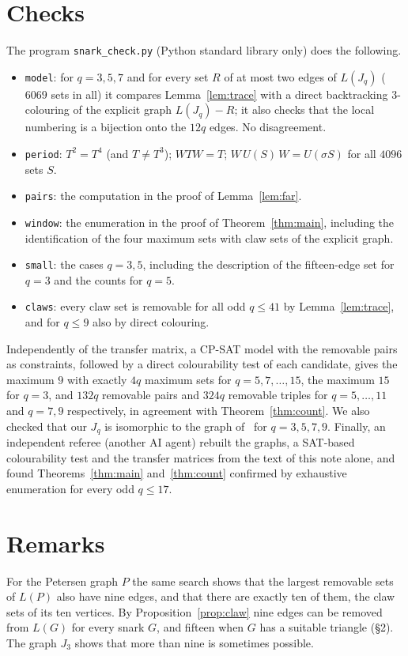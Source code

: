 \documentclass[11pt]{amsart}
\theoremstyle{remark}
\begin{document}
\section{Checks}\label{sec:check}
The program \texttt{snark\_check.py} (Python standard library only) does the following.
\begin{itemize}
\item \texttt{model}: for $q=3,5,7$ and for every set $R$ of at most two edges of $L(J_q)$ ($6069$ sets in all) it
compares Lemma~\ref{lem:trace} with a direct backtracking $3$-colouring of the explicit graph $L(J_q)-R$; it also
checks that the local numbering is a bijection onto the $12q$ edges. No disagreement.
\item \texttt{period}: $T^2=T^4$ (and $T\ne T^3$); $WTW=T$; $W\,U(S)\,W=U(\sigma S)$ for all $4096$ sets $S$.
\item \texttt{pairs}: the computation in the proof of Lemma~\ref{lem:far}.
\item \texttt{window}: the enumeration in the proof of Theorem~\ref{thm:main}, including the identification of the
four maximum sets with claw sets of the explicit graph.
\item \texttt{small}: the cases $q=3,5$, including the description of the fifteen-edge set for $q=3$ and the
counts for $q=5$.
\item \texttt{claws}: every claw set is removable for all odd $q\le41$ by Lemma~\ref{lem:trace}, and for $q\le9$ also
by direct colouring.
\end{itemize}
Independently of the transfer matrix, a CP-SAT model with the removable pairs as constraints, followed by a direct
colourability test of each candidate, gives the maximum $9$ with exactly $4q$ maximum sets for $q=5,7,\dots,15$,
the maximum $15$ for $q=3$, and $132q$ removable pairs and $324q$ removable triples for $q=5,\dots,11$ and $q=7,9$
respectively, in agreement with Theorem~\ref{thm:count}. We also checked that our $J_q$ is isomorphic to the graph
of~\cite[\S7.2.2.2, ex.~176]{knuth4b} for $q=3,5,7,9$. Finally, an independent referee (another AI agent) rebuilt
the graphs, a SAT-based colourability test and the transfer matrices from the text of this note alone, and
found Theorems~\ref{thm:main} and~\ref{thm:count} confirmed by exhaustive enumeration for every odd
$q\le17$.

\section{Remarks}
For the Petersen graph $P$ the same search shows that the largest removable sets of $L(P)$ also have nine edges,
and that there are exactly ten of them, the claw sets of its ten vertices. By Proposition~\ref{prop:claw} nine
edges can be removed from $L(G)$ for every snark $G$, and fifteen when $G$ has a suitable triangle
(\S2). The graph $J_3$ shows that more than nine is sometimes possible.
\end{document}
